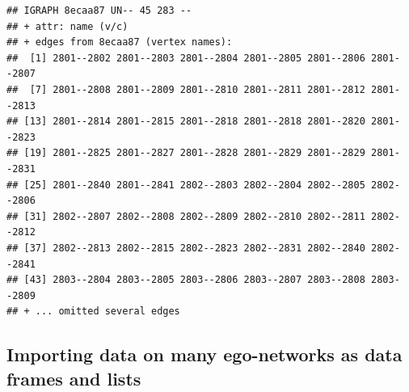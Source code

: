 \documentclass[
]{book}
\begin{document}
\begin{verbatim}
## IGRAPH 8ecaa87 UN-- 45 283 -- 
## + attr: name (v/c)
## + edges from 8ecaa87 (vertex names):
##  [1] 2801--2802 2801--2803 2801--2804 2801--2805 2801--2806 2801--2807
##  [7] 2801--2808 2801--2809 2801--2810 2801--2811 2801--2812 2801--2813
## [13] 2801--2814 2801--2815 2801--2818 2801--2818 2801--2820 2801--2823
## [19] 2801--2825 2801--2827 2801--2828 2801--2829 2801--2829 2801--2831
## [25] 2801--2840 2801--2841 2802--2803 2802--2804 2802--2805 2802--2806
## [31] 2802--2807 2802--2808 2802--2809 2802--2810 2802--2811 2802--2812
## [37] 2802--2813 2802--2815 2802--2823 2802--2831 2802--2840 2802--2841
## [43] 2803--2804 2803--2805 2803--2806 2803--2807 2803--2808 2803--2809
## + ... omitted several edges
\end{verbatim}

\hypertarget{importing-data-on-many-ego-networks-as-data-frames-and-lists}{%
\subsection{Importing data on many ego-networks as data frames and lists}\label{importing-data-on-many-ego-networks-as-data-frames-and-lists}}
\end{document}
